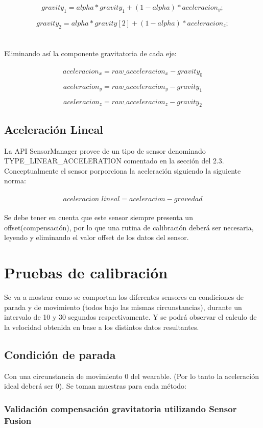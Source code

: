 \[gravity_1 = alpha * gravity_1 + (1 - alpha) * aceleracion_y;\]

\[gravity_2 = alpha * gravity[2] + (1 - alpha) * aceleracion_z;\]
\\
\\
Eliminando así la componente gravitatoria de cada eje:
\\
\\
\[aceleracion_x = raw\_acceleracion_x - gravity_0\]

\[aceleracion_y = raw\_acceleracion_y - gravity_1\]

\[aceleracion_z = raw\_acceleracion_z - gravity_2\]

\subsection{Aceleración Lineal}

La API SensorManager provee de un tipo de sensor denominado TYPE\_LINEAR\_ACCELERATION comentado en la sección del 2.3. Conceptualmente el sensor porporciona la aceleración siguiendo la siguiente norma:
\\\\
\[aceleracion\_lineal = aceleracion - gravedad\]
\\
Se debe tener en cuenta que este sensor siempre presenta un offset(compensación), por lo que una rutina de calibración deberá ser necesaria, leyendo y eliminando el valor offset de los datos del sensor.

\section{Pruebas de calibración}

Se va a mostrar como se comportan los diferentes sensores en condiciones de parada y de movimiento (todos bajo las mismas circunstancias), durante un intervalo de 10 y 30 segundos respectivamente. Y se podrá observar el calculo de la velocidad obtenida en base a los distintos datos resultantes.

\subsection{Condición de parada}

Con una circunstancia de movimiento 0 del wearable. (Por lo tanto la aceleración ideal deberá ser 0). Se toman muestras para cada método:
\subsubsection{Validación compensación gravitatoria utilizando Sensor Fusion}

